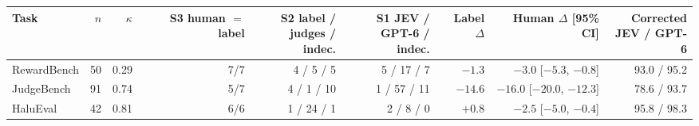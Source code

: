 \begin{tabular}{@{}lrrrrrrrr@{}}\toprule
Task & $n$ & $\kappa$ & \shortstack{S3 human\\$=$ label} & \shortstack{S2 label /\\judges / indec.} & \shortstack{S1 JEV /\\GPT-6 / indec.} & \shortstack{Label\\$\Delta$} & \shortstack{Human $\Delta$\\{}[95\% CI]} & \shortstack{Corrected\\JEV / GPT-6} \\\midrule
RewardBench & 50 & 0.29 & 7/7 & 4 / 5 / 5 & 5 / 17 / 7 & $-1.3$ & $-3.0$ [$-5.3$, $-0.8$] & 93.0 / 95.2 \\
JudgeBench & 91 & 0.74 & 5/7 & 4 / 1 / 10 & 1 / 57 / 11 & $-14.6$ & $-16.0$ [$-20.0$, $-12.3$] & 78.6 / 93.7 \\
HaluEval & 42 & 0.81 & 6/6 & 1 / 24 / 1 & 2 / 8 / 0 & $+0.8$ & $-2.5$ [$-5.0$, $-0.4$] & 95.8 / 98.3 \\
\bottomrule\end{tabular}
